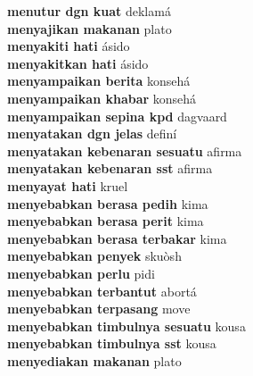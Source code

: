 \textbf{ menutur dgn kuat  } deklamá \\
\textbf{ menyajikan makanan  } plato \\
\textbf{ menyakiti hati  } ásido \\
\textbf{ menyakitkan hati  } ásido \\
\textbf{ menyampaikan berita  } konsehá \\
\textbf{ menyampaikan khabar  } konsehá \\
\textbf{ menyampaikan sepina kpd  } dagvaard \\
\textbf{ menyatakan dgn jelas  } definí \\
\textbf{ menyatakan kebenaran sesuatu  } afirma \\
\textbf{ menyatakan kebenaran sst  } afirma \\
\textbf{ menyayat hati  } kruel \\
\textbf{ menyebabkan berasa pedih  } kima \\
\textbf{ menyebabkan berasa perit  } kima \\
\textbf{ menyebabkan berasa terbakar  } kima \\
\textbf{ menyebabkan penyek  } skuòsh \\
\textbf{ menyebabkan perlu  } pidi \\
\textbf{ menyebabkan terbantut  } abortá \\
\textbf{ menyebabkan terpasang  } move \\
\textbf{ menyebabkan timbulnya sesuatu  } kousa \\
\textbf{ menyebabkan timbulnya sst  } kousa \\
\textbf{ menyediakan makanan  } plato \\
